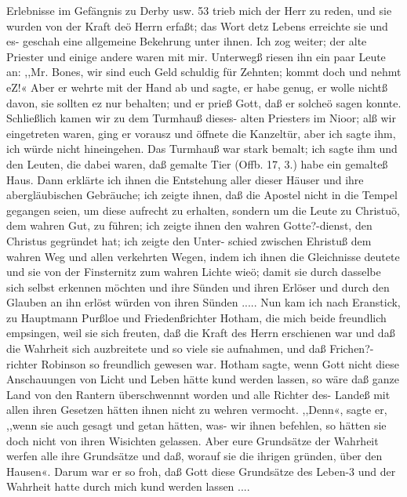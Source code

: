 Erlebnisse im Gefängnis zu Derby usw. 53
trieb mich der Herr zu reden, und sie wurden von der Kraft deö
Herrn erfaßt; das Wort detz Lebens erreichte sie und es- geschah
eine allgemeine Bekehrung unter ihnen.
Ich zog weiter; der alte Priester und einige andere waren
mit mir. Unterwegß riesen ihn ein paar Leute an: ,,Mr. Bones,
wir sind euch Geld schuldig für Zehnten; kommt doch und nehmt
eZ!« Aber er wehrte mit der Hand ab und sagte, er habe genug,
er wolle nichtß davon, sie sollten ez nur behalten; und er prieß
Gott, daß er solcheö sagen konnte. Schließlich kamen wir zu dem
Turmhauß dieses- alten Priesters im Nioor; alß wir eingetreten
waren, ging er vorausz und öffnete die Kanzeltür, aber ich sagte ihm,
ich würde nicht hineingehen. Das Turmhauß war stark bemalt;
ich sagte ihm und den Leuten, die dabei waren, daß gemalte Tier
(Offb. 17, 3.) habe ein gemalteß Haus. Dann erklärte ich ihnen die
Entstehung aller dieser Häuser und ihre abergläubischen Gebräuche;
ich zeigte ihnen, daß die Apostel nicht in die Tempel gegangen
seien, um diese aufrecht zu erhalten, sondern um die Leute zu
Christuö, dem wahren Gut, zu führen; ich zeigte ihnen den wahren
Gotte?-dienst, den Christus gegründet hat; ich zeigte den Unter-
schied zwischen Ehristuß dem wahren Weg und allen verkehrten
Wegen, indem ich ihnen die Gleichnisse deutete und sie von der
Finsternitz zum wahren Lichte wieö; damit sie durch dasselbe sich
selbst erkennen möchten und ihre Sünden und ihren Erlöser und
durch den Glauben an ihn erlöst würden von ihren Sünden .....
Nun kam ich nach Eranstick, zu Hauptmann Purßloe und
Friedenßrichter Hotham, die mich beide freundlich empsingen, weil
sie sich freuten, daß die Kraft des Herrn erschienen war und daß
die Wahrheit sich auzbreitete und so viele sie aufnahmen, und daß
Frichen?-richter Robinson so freundlich gewesen war. Hotham
sagte, wenn Gott nicht diese Anschauungen von Licht und Leben
hätte kund werden lassen, so wäre daß ganze Land von den
Rantern überschwennnt worden und alle Richter des- Landeß mit
allen ihren Gesetzen hätten ihnen nicht zu wehren vermocht. ,,Denn«,
sagte er, ,,wenn sie auch gesagt und getan hätten, was- wir ihnen
befehlen, so hätten sie doch nicht von ihren Wisichten gelassen.
Aber eure Grundsätze der Wahrheit werfen alle ihre Grundsätze
und daß, worauf sie die ihrigen gründen, über den Hausen«.
Darum war er so froh, daß Gott diese Grundsätze des Leben-3
und der Wahrheit hatte durch mich kund werden lassen ....


